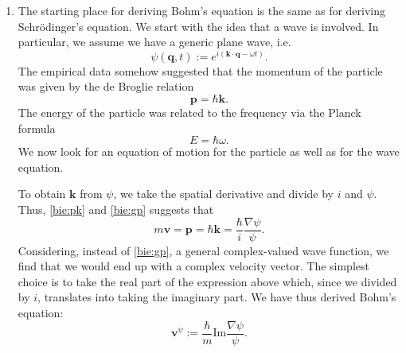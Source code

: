 \documentclass[11pt]{article}
\theoremstyle{remark}
\begin{document}
\begin{enumerate}
\item The starting place for deriving 
Bohm's equation is the same as for deriving
 Schr\"odinger's equation. We start with the idea that a wave is
involved. In particular, we assume we have a generic plane wave, i.e.\
\begin{equation} \label{bie:gp}
 \ensuremath{\psi}(\ensuremath{\boldsymbol{q}}, t) \ensuremath{:=} e^{i(\ensuremath{\boldsymbol{k}}
\cdot \ensuremath{\boldsymbol{q}} - \omega t)}.
\end{equation}
The empirical data somehow suggested that the momentum of the particle
was given by the de Broglie relation
\begin{equation} \label{bie:pk}
\ensuremath{\boldsymbol{p}} = \ensuremath{\hbar} \ensuremath{\boldsymbol{k}} . 
\end{equation}
The energy of the particle was related to the frequency via the Planck
formula 
\begin{equation} \label{bie:ew}
 E = \hbar \omega.
\end{equation}
We now look for an equation of motion for the particle as well as for the wave
equation. 

To obtain $\ensuremath{\boldsymbol{k}}$ from $\ensuremath{\psi}$, we take the spatial derivative
and divide by $i$ and $\ensuremath{\psi}$. Thus, \eqref{bie:pk} and \eqref{bie:gp}
suggests
that 
\[ m \ensuremath{\boldsymbol{v}} = \ensuremath{\boldsymbol{p}} = \ensuremath{\hbar} \ensuremath{\boldsymbol{k}} = \frac{\ensuremath{\hbar}}{i} \frac{\nabla \ensuremath{\psi}}{\ensuremath{\psi}}.\]
Considering, instead of \eqref{bie:gp}, a general complex-valued wave function, 
we find that we would end up
with a complex velocity vector. The simplest choice is to take the real
part of the expression above which, since we divided by $i$,
translates into taking the imaginary part. 
We have thus derived Bohm's equation:
\[
\ensuremath{\boldsymbol{v}}^{\ensuremath{\psi}} \ensuremath{:=} \frac{\ensuremath{\hbar}}{m} \textrm{Im} \frac{\nabla \ensuremath{\psi}}{\ensuremath{\psi}}.
\]


\end{enumerate}
\end{document}

